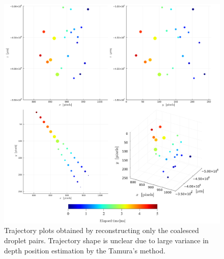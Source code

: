 \begin{figure}[H]
    \centering
    \includegraphics[width=1.00\linewidth]{./Figure/4_Results/exp/traj_detail.pdf}
    \caption{Trajectory plots obtained by reconstructing only the coalesced droplet pairs. Trajectory shape is unclear due to large variance in depth position estimation by the Tamura's method.}
    \label{fig:3dtrajectory_detail}
\end{figure}

